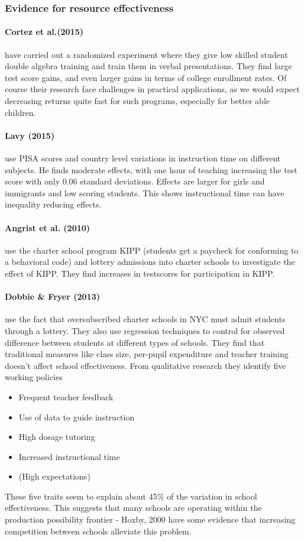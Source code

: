 \documentclass[12pt, a4paper]{article}
\begin{document}
\begin{multicols}{2}
\subsubsection{Evidence for resource effectiveness}
\paragraph{Cortez et al.(2015)} have carried out a randomized experiment where they give low skilled student double algebra training and train them in verbal presentations. They find large test score gains, and even larger gains in terms of college enrollment rates. Of course their research face challenges in practical applications, as we would expect decreasing returns quite fast for such programs, especially for better able children. 

\paragraph{Lavy (2015)} use PISA scores and country level variations in instruction time on different subjects. He finds moderate effects, with one hour of teaching increasing the test score with only 0.06 standard deviations. Effects are larger for girls and immigrants and low scoring students. This shows instructional time can have inequality reducing effects. 

\paragraph{Angrist et al. (2010)} use the charter school program KIPP (students get a paycheck for conforming to a behavioral code) and lottery admissions into charter schools to investigate the effect of KIPP. They find increases in testscores for participation in KIPP.

\paragraph{Dobbie \& Fryer (2013)} use the fact that oversubscribed charter schools in NYC must admit students through a lottery. They also use regression techniques to control for observed difference between students at different types of schools. They find that traditional measures like class size, per-pupil expenditure and teacher training doesn't affect school effectiveness. From qualitative research they identify five working policies
\begin{itemize}
\item Frequent teacher feedback
\item Use of data to guide instruction
\item High dosage tutoring
\item Increased instructional time
\item (High expectations)
\end{itemize}
These five traits seem to explain about 45\% of the variation in school effectiveness. This suggests that many schools are operating within the production possibility frontier - Hoxby, 2000 have some evidence that increasing competition between schools alleviate this problem. 


\end{multicols}
\end{document}

